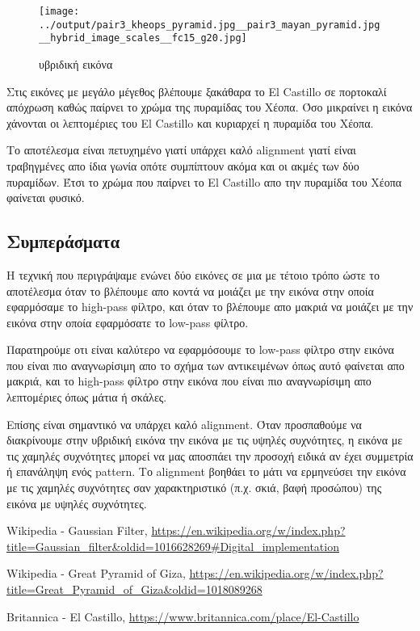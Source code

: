 \documentclass[11pt]{scrartcl} %
\begin{document}
\begin{figure}[H]
  \texttt{[image: ../output/pair3\_kheops\_pyramid.jpg\_\_pair3\_mayan\_pyramid.jpg\_\_hybrid\_image\_scales\_\_fc15\_g20.jpg]}
  \caption{υβριδική εικόνα}
\end{figure}

Στις εικόνες με μεγάλο μέγεθος βλέπουμε ξακάθαρα το El Castillo σε πορτοκαλί απόχρωση καθώς παίρνει το χρώμα της πυραμίδας του Χέοπα. Όσο μικραίνει η εικόνα χάνονται οι λεπτομέριες του El Castillo και κυριαρχεί η πυραμίδα του Χέοπα.

Το αποτέλεσμα είναι πετυχημένο γιατί υπάρχει καλό alignment γιατί είναι τραβηγμένες απο ίδια γωνία οπότε συμπίπτουν ακόμα και οι ακμές των δύο πυραμίδων. Έτσι το χρώμα που παίρνει το El Castillo απο την πυραμίδα του Χέοπα φαίνεται φυσικό.

\subsection{Συμπεράσματα}

Η τεχνική που περιγράψαμε ενώνει δύο εικόνες σε μια με τέτοιο τρόπο ώστε το αποτέλεσμα όταν το βλέπουμε απο κοντά να μοιάζει με την εικόνα στην οποία εφαρμόσαμε το high-pass φίλτρο, και όταν το βλέπουμε απο μακριά να μοιάζει με την εικόνα στην οποία εφαρμόσατε το low-pass φίλτρο.

Παρατηρούμε οτι είναι καλύτερο να εφαρμόσουμε το low-pass φίλτρο στην εικόνα που είναι πιο αναγνωρίσιμη απο το σχήμα των αντικειμένων όπως αυτό φαίνεται απο μακριά,
και το high-pass φίλτρο στην εικόνα που είναι πιο αναγνωρίσιμη απο λεπτομέριες όπως μάτια ή σκάλες.

Επίσης είναι σημαντικό να υπάρχει καλό alignment.
Όταν προσπαθούμε να διακρίνουμε στην υβριδική εικόνα την εικόνα με τις υψηλές συχνότητες, η εικόνα με τις χαμηλές συχνότητες μπορεί να μας αποσπάει την προσοχή ειδικά αν έχει συμμετρία ή επανάληψη ενός pattern.
Το alignment βοηθάει το μάτι να ερμηνεύσει την εικόνα με τις χαμηλές συχνότητες σαν χαρακτηριστικό (π.χ. σκιά, βαφή προσώπου) της εικόνα με υψηλές συχνότητες.


\begin{thebibliography}{3}

Wikipedia - Gaussian Filter,
\url{https://en.wikipedia.org/w/index.php?title=Gaussian_filter&oldid=1016628269#Digital_implementation}

Wikipedia - Great Pyramid of Giza,
\url{https://en.wikipedia.org/w/index.php?title=Great_Pyramid_of_Giza&oldid=1018089268}

Britannica - El Castillo,
\url{https://www.britannica.com/place/El-Castillo}

\end{thebibliography}
\end{document}
